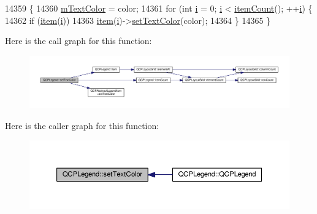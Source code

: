 \begin{DoxyCode}
14359                                                 \{
14360   \hyperlink{class_q_c_p_legend_a478b2d809a7390e9ff8f8bb70d6bd9fe}{mTextColor} = color;
14361   \textcolor{keywordflow}{for} (\textcolor{keywordtype}{int} \hyperlink{_comparision_pictures_2_createtest_image_8m_a6f6ccfcf58b31cb6412107d9d5281426}{i} = 0; \hyperlink{_comparision_pictures_2_createtest_image_8m_a6f6ccfcf58b31cb6412107d9d5281426}{i} < \hyperlink{class_q_c_p_legend_a198228e9cdc78d3a3c306fa6763d0404}{itemCount}(); ++\hyperlink{_comparision_pictures_2_createtest_image_8m_a6f6ccfcf58b31cb6412107d9d5281426}{i}) \{
14362     \textcolor{keywordflow}{if} (\hyperlink{class_q_c_p_legend_a454272d7094437beb3278a2294006da5}{item}(\hyperlink{_comparision_pictures_2_createtest_image_8m_a6f6ccfcf58b31cb6412107d9d5281426}{i}))
14363       \hyperlink{class_q_c_p_legend_a454272d7094437beb3278a2294006da5}{item}(\hyperlink{_comparision_pictures_2_createtest_image_8m_a6f6ccfcf58b31cb6412107d9d5281426}{i})->\hyperlink{class_q_c_p_abstract_legend_item_a6ebace6aaffaedcdab2d74e88acc2d1e}{setTextColor}(color);
14364   \}
14365 \}
\end{DoxyCode}


Here is the call graph for this function\+:\nopagebreak
\begin{figure}[H]
\begin{center}
\leavevmode
\includegraphics[width=350pt]{class_q_c_p_legend_ae1eb239ff4a4632fe1b6c3e668d845c6_cgraph}
\end{center}
\end{figure}




Here is the caller graph for this function\+:\nopagebreak
\begin{figure}[H]
\begin{center}
\leavevmode
\includegraphics[width=350pt]{class_q_c_p_legend_ae1eb239ff4a4632fe1b6c3e668d845c6_icgraph}
\end{center}
\end{figure}


